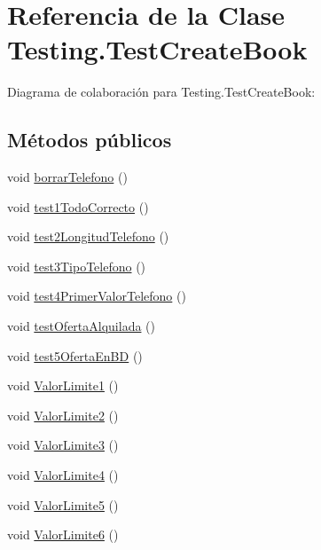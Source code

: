 \hypertarget{class_testing_1_1_test_create_book}{}\section{Referencia de la Clase Testing.\+Test\+Create\+Book}
\label{class_testing_1_1_test_create_book}


Diagrama de colaboración para Testing.\+Test\+Create\+Book\+:
\subsection*{Métodos públicos}
\begin{DoxyCompactItemize}
\item 
void \mbox{\hyperlink{class_testing_1_1_test_create_book_a22b7be219ee185ba9d0c8c8d1703ba7a}{borrar\+Telefono}} ()
\item 
void \mbox{\hyperlink{class_testing_1_1_test_create_book_ab4204dc3d4f266e549f33c7124c62863}{test1\+Todo\+Correcto}} ()
\item 
void \mbox{\hyperlink{class_testing_1_1_test_create_book_a6369c3d0cf18dbb44ddec578fc74751e}{test2\+Longitud\+Telefono}} ()
\item 
void \mbox{\hyperlink{class_testing_1_1_test_create_book_a8ebd6d3cb28a0eb97216a50978700aad}{test3\+Tipo\+Telefono}} ()
\item 
void \mbox{\hyperlink{class_testing_1_1_test_create_book_a54787ef66ad57d68e99ed5b067342f64}{test4\+Primer\+Valor\+Telefono}} ()
\item 
void \mbox{\hyperlink{class_testing_1_1_test_create_book_aadb64058f69cefdef24ffab6d7ec76c8}{test\+Oferta\+Alquilada}} ()
\item 
void \mbox{\hyperlink{class_testing_1_1_test_create_book_a8916ec26282dd0821b6740cfbb4b43ac}{test5\+Oferta\+En\+BD}} ()
\item 
void \mbox{\hyperlink{class_testing_1_1_test_create_book_a198ebafb70f3e7233b7a050fdc6660c4}{Valor\+Limite1}} ()
\item 
void \mbox{\hyperlink{class_testing_1_1_test_create_book_a996c87c88057d6cc52aff7c69467a77f}{Valor\+Limite2}} ()
\item 
void \mbox{\hyperlink{class_testing_1_1_test_create_book_a99968cb22ff2b4012d79a191144f03d1}{Valor\+Limite3}} ()
\item 
void \mbox{\hyperlink{class_testing_1_1_test_create_book_aa03012fcb19cb39318030c62e0d5c2c0}{Valor\+Limite4}} ()
\item 
void \mbox{\hyperlink{class_testing_1_1_test_create_book_a2035e4dc156b0c064f828a621a5d8232}{Valor\+Limite5}} ()
\item 
void \mbox{\hyperlink{class_testing_1_1_test_create_book_acadc2ebf7b47c3d62a7164d7e1f009ad}{Valor\+Limite6}} ()
\end{DoxyCompactItemize}

